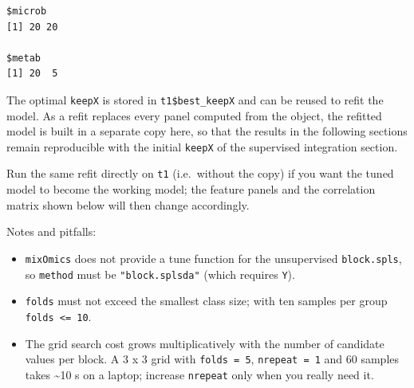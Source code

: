 \documentclass[
]{book}
\newenvironment{Shaded}{\begin{snugshade}}{\end{snugshade}}
\newcommand{\AttributeTok}[1]{\textcolor[rgb]{0.13,0.29,0.53}{#1}}
\newcommand{\CommentTok}[1]{\textcolor[rgb]{0.56,0.35,0.01}{\textit{#1}}}
\newcommand{\ConstantTok}[1]{\textcolor[rgb]{0.56,0.35,0.01}{#1}}
\newcommand{\DecValTok}[1]{\textcolor[rgb]{0.00,0.00,0.81}{#1}}
\newcommand{\FunctionTok}[1]{\textcolor[rgb]{0.13,0.29,0.53}{\textbf{#1}}}
\newcommand{\NormalTok}[1]{#1}
\newcommand{\OtherTok}[1]{\textcolor[rgb]{0.56,0.35,0.01}{#1}}
\newcommand{\SpecialCharTok}[1]{\textcolor[rgb]{0.81,0.36,0.00}{\textbf{#1}}}
\providecommand{\tightlist}{%
  \setlength{\itemsep}{0pt}\setlength{\parskip}{0pt}}
\begin{document}
\begin{verbatim}
$microb
[1] 20 20

$metab
[1] 20  5
\end{verbatim}

The optimal \texttt{keepX} is stored in \texttt{t1\$best\_keepX} and can be reused to refit the model.
As a refit replaces every panel computed from the object, the refitted model is built in a separate copy here, so that the results in the following sections remain reproducible with the initial \texttt{keepX} of the supervised integration section.

\begin{Shaded}
\end{Shaded}

Run the same refit directly on \texttt{t1} (i.e.~without the copy) if you want the tuned model to become the working model; the feature panels and the correlation matrix shown below will then change accordingly.

Notes and pitfalls:

\begin{itemize}
\tightlist
\item
  \texttt{mixOmics} does not provide a tune function for the unsupervised \texttt{block.spls}, so \texttt{method} must be \texttt{"block.splsda"} (which requires \texttt{Y}).
\item
  \texttt{folds} must not exceed the smallest class size; with ten samples per group \texttt{folds\ \textless{}=\ 10}.
\item
  The grid search cost grows multiplicatively with the number of candidate values per block.
  A 3 x 3 grid with \texttt{folds\ =\ 5}, \texttt{nrepeat\ =\ 1} and 60 samples takes \textasciitilde10 s on a laptop; increase \texttt{nrepeat} only when you really need it.
\end{itemize}
\end{document}
